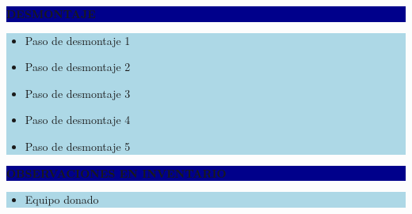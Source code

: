 \documentclass[11pt]{article}
\newcommand{\seccionbanda}[1]{%
  \vspace{0.6em}
  \noindent\colorbox{darkblue}{\parbox{\dimexpr\linewidth-2\fboxsep}{%
    \centering\color{white}\bfseries #1}}\par\vspace{0.6em}
}
\begin{document}
\seccionbanda{DESMONTAJE}
\noindent\colorbox{lightblue}{\parbox{\dimexpr\linewidth-2\fboxsep\relax}{%
\begin{itemize}[label=$\square$, itemsep=4pt]
\item Paso de desmontaje 1
\item Paso de desmontaje 2
\item Paso de desmontaje 3
\item Paso de desmontaje 4
\item Paso de desmontaje 5
\end{itemize}
}}\par
\seccionbanda{OBSERVACIONES EN INVENTARIO}
\noindent\colorbox{lightblue}{\parbox{\dimexpr\linewidth-2\fboxsep\relax}{\begin{itemize}[itemsep=4pt]
\item Equipo donado
\end{itemize}}}\par
\end{document}
